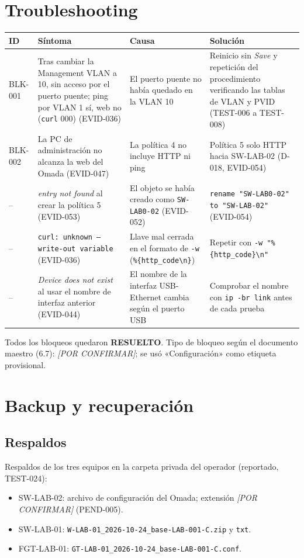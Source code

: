 \documentclass[11pt,a4paper]{article}
\newcommand{\pc}{\textcolor{muted}{\textit{[POR CONFIRMAR]}}}
\newcommand{\estado}[1]{%
  \ifstrequal{#1}{COMPLETADA}{\textcolor{okgreen}{\textbf{\footnotesize #1}}}{%
  \ifstrequal{#1}{OPERATIVO VALIDADO}{\textcolor{okgreen}{\textbf{\footnotesize #1}}}{%
  \ifstrequal{#1}{OK}{\textcolor{okgreen}{\textbf{\footnotesize #1}}}{%
  \ifstrequal{#1}{RESUELTO}{\textcolor{okgreen}{\textbf{\footnotesize #1}}}{%
  \ifstrequal{#1}{EN CURSO}{\textcolor{amber}{\textbf{\footnotesize #1}}}{%
  \ifstrequal{#1}{REPORTADO}{\textcolor{amber}{\textbf{\footnotesize #1}}}{%
  \ifstrequal{#1}{NO EJECUTADA}{\textcolor{muted}{\textbf{\footnotesize #1}}}{%
  \ifstrequal{#1}{PROPUESTO}{\textcolor{violet}{\textbf{\footnotesize #1}}}{%
  \ifstrequal{#1}{PENDIENTE}{\textcolor{alertred}{\textbf{\footnotesize #1}}}{%
  \textbf{\footnotesize #1}}}}}}}}}}}
\newcommand{\cab}{\rowcolor{light}}
\newcommand{\fn}[1]{\texttt{\fnbreaks#1\fnend}}
\def\fnbreaks#1\fnend{\begingroup\fnactive\scantokens{#1\noexpand}\endgroup}
\gdef\fnactive{\catcode`\-=\active\catcode`\/=\active
  \def-{\char`\-\allowbreak}\def/{\char`\/\allowbreak}\let\_\fnus}
\newcommand{\fnus}{\textunderscore\allowbreak}
\begin{document}
\section{Troubleshooting}
{\small
\begin{longtable}{L{1.5cm} L{3.8cm} L{4.4cm} L{5.0cm}}
  \toprule
  \cab\textbf{ID} & \textbf{Síntoma} & \textbf{Causa} & \textbf{Solución}\\
  \midrule
  \endhead
  BLK-001 & Tras cambiar la Management VLAN a 10, sin acceso por el puerto puente; ping por VLAN 1 sí, web no (\texttt{curl} 000) (EVID-036) & El puerto puente no había quedado en la VLAN 10 & Reinicio sin \emph{Save} y repetición del procedimiento verificando las tablas de VLAN y PVID (TEST-006 a TEST-008)\\
  BLK-002 & La PC de administración no alcanza la web del Omada (EVID-047) & La política 4 no incluye HTTP ni ping & Política 5 solo HTTP hacia SW-LAB-02 (D-018, EVID-054)\\
  -- & \emph{entry not found} al crear la política 5 (EVID-053) & El objeto se había creado como \texttt{SW-LAB0-02} (EVID-052) & \texttt{rename "SW-LAB0-02" to "SW-LAB-02"} (EVID-054)\\
  -- & \texttt{curl: unknown --write-out variable} (EVID-036) & Llave mal cerrada en el formato de \texttt{-w} (\texttt{\%\{http\_code\textbackslash n\}}) & Repetir con \texttt{-w "\%\{http\_code\}\textbackslash n"}\\
  -- & \emph{Device does not exist} al usar el nombre de interfaz anterior (EVID-044) & El nombre de la interfaz USB-Ethernet cambia según el puerto USB & Comprobar el nombre con \texttt{ip -br link} antes de cada prueba\\
  \bottomrule
\end{longtable}
}

Todos los bloqueos quedaron \estado{RESUELTO}. Tipo de bloqueo según el documento maestro (6.7): \pc{}; se usó «Configuración» como etiqueta provisional.

\section{Backup y recuperación}
\subsection{Respaldos}
Respaldos de los tres equipos en la carpeta privada del operador (reportado, TEST-024):
\begin{itemize}
  \item SW-LAB-02: archivo de configuración del Omada; extensión \pc{} (PEND-005).
  \item SW-LAB-01: \fn{SW-LAB-01\_2026-10-24\_base-LAB-001-C.zip} y \fn{.txt}.
  \item FGT-LAB-01: \fn{FGT-LAB-01\_2026-10-24\_base-LAB-001-C.conf}.
\end{itemize}
\end{document}
